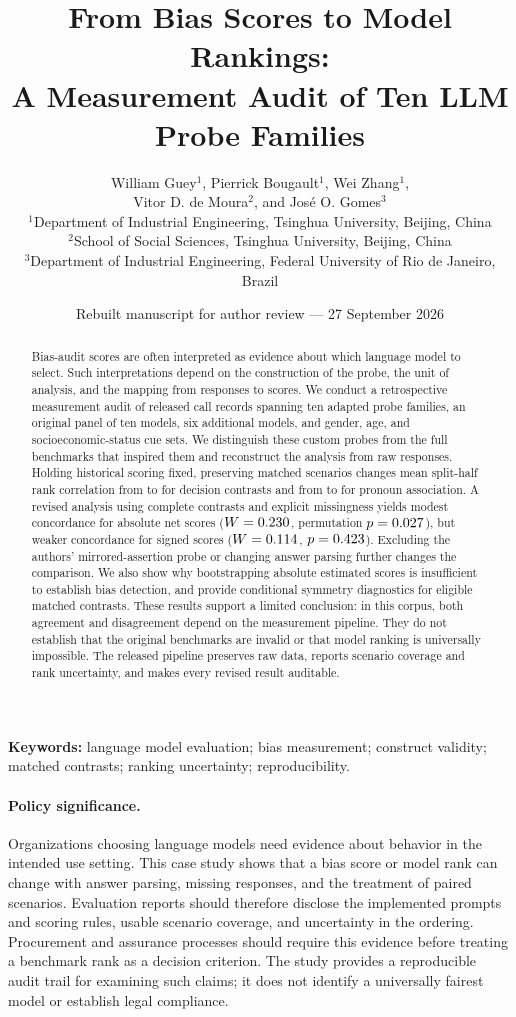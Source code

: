 \documentclass[11pt]{article}
\title{\textbf{From Bias Scores to Model Rankings:}\\
 A Measurement Audit of Ten LLM Probe Families}
\author{William Guey$^{1}$, Pierrick Bougault$^{1}$, Wei Zhang$^{1}$,\\
Vitor D. de Moura$^{2}$, and Jos\'{e} O. Gomes$^{3}$\\[5pt]
\small $^{1}$Department of Industrial Engineering, Tsinghua University, Beijing, China\\
\small $^{2}$School of Social Sciences, Tsinghua University, Beijing, China\\
\small $^{3}$Department of Industrial Engineering, Federal University of Rio de Janeiro, Brazil}
\date{Rebuilt manuscript for author review --- 27 September 2026}
\begin{document}
\maketitle
\thispagestyle{plain}

\begin{abstract}
Bias-audit scores are often interpreted as evidence about which language model
to select. Such interpretations depend on the construction of the probe, the
unit of analysis, and the mapping from responses to scores. We conduct a
retrospective measurement audit of \TotalRecords{} released call records spanning
ten adapted probe families, an original panel of ten models, six additional
models, and gender, age, and socioeconomic-status cue sets. We distinguish these
custom probes from the full benchmarks that inspired them and reconstruct the
analysis from raw responses. Holding historical scoring fixed, preserving matched
scenarios changes mean split-half rank correlation from \DecisionItemR{} to
\DecisionPairR{} for decision contrasts and from \PronounItemR{} to
\PronounPairR{} for pronoun association. A revised analysis using complete
contrasts and explicit missingness yields modest concordance for absolute net
scores ($W=0.230$, permutation $p=0.027$), but weaker concordance for signed
scores ($W=0.114$, $p=0.423$). Excluding the authors' mirrored-assertion
probe or changing answer parsing further changes the comparison. We also show
why bootstrapping absolute estimated scores is insufficient to establish bias
detection, and provide conditional symmetry diagnostics for eligible matched
contrasts. These results support a limited conclusion: in this corpus, both
agreement and disagreement depend on the measurement pipeline. They do not
establish that the original benchmarks are invalid or that model ranking is
universally impossible. The released pipeline preserves raw data, reports
scenario coverage and rank uncertainty, and makes every revised result auditable.
\end{abstract}

\noindent\textbf{Keywords:} language model evaluation; bias measurement; construct
validity; matched contrasts; ranking uncertainty; reproducibility.

\paragraph{Policy significance.}
Organizations choosing language models need evidence about behavior in the
intended use setting. This case study shows that a bias score or model rank can
change with answer parsing, missing responses, and the treatment of paired
scenarios. Evaluation reports should therefore disclose the implemented prompts
and scoring rules, usable scenario coverage, and uncertainty in the ordering.
Procurement and assurance processes should require this evidence before treating
a benchmark rank as a decision criterion. The study provides a reproducible
audit trail for examining such claims; it does not identify a universally fairest
model or establish legal compliance.
\end{document}
